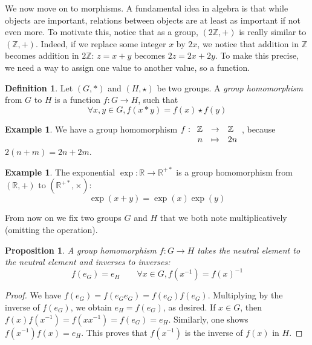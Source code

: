 \documentclass{book}
\newcommand{\Z}{\mathbb{Z}}
\newcommand{\R}{\mathbb{R}}
\newcommand{\applic}[4]{\begin{array}[t]{rcl}
#1 & \to & #2 \\
#3 & \mapsto & #4
\end{array}}
\theoremstyle{plain}
\newtheorem{proposition}[theorem]{Proposition}
\theoremstyle{definition}
\newtheorem{definition}[theorem]{Definition}
\newtheorem{example}[theorem]{Example}
\theoremstyle{remark}
\begin{document}
We now move on to morphisms. A fundamental idea in algebra is that while objects are important, relations between objects are at least as important if not even more. To motivate this, notice that as a group, $(2\Z,+)$ is really similar to $(\Z,+)$. Indeed, if we replace some integer $x$ by $2x$, we notice that addition in $\Z$ becomes addition in $2\Z$: $z = x+y$ becomes $2z = 2x + 2y$. To make this precise, we need a way to assign one value to another value, so a function.

\begin{definition}
    Let $(G,*)$ and $(H,\star)$ be two groups. A \emph{group homomorphism} from $G$ to $H$ is a function $f : G \to H$, such that
    \[\forall x,y \in G, f(x * y) = f(x) \star f(y)\]
\end{definition}

\begin{example}
    We have a group homomorphism $f : \applic{\Z}{\Z}{n}{2n}$, because $2(n+m) = 2n + 2m$. 
\end{example}

\begin{example}
    The exponential $\exp : \R \to \R^{+*}$ is a group homomorphism from $(\R,+)$ to $(\R^{+*},\times)$:
    \[\exp(x+y) = \exp(x)\exp(y)\]
\end{example}

From now on we fix two groups $G$ and $H$ that we both note multiplicatively (omitting the operation).

\begin{proposition}
    A group homomorphism $f : G \to H$ takes the neutral element to the neutral element and inverses to inverses:
    \[f(e_G) = e_H \qquad \forall x \in G, f(x^{-1}) = f(x)^{-1}\]
\end{proposition}

\begin{proof}
    We have $f(e_G) = f(e_G e_G) = f(e_G) f(e_G)$. Multiplying by the inverse of $f(e_G)$, we obtain $e_H = f(e_G)$, as desired. If $x \in G$, then $f(x)f(x^{-1}) = f(xx^{-1}) = f(e_G) = e_H$. Similarly, one shows $f(x^{-1})f(x) = e_H$. This proves that $f(x^{-1})$ is the inverse of $f(x)$ in $H$.
\end{proof}

\end{document}
